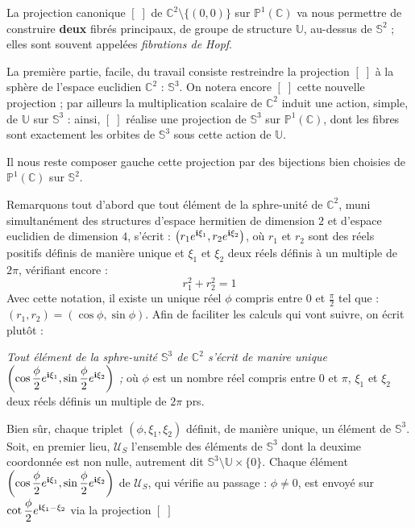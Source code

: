 La projection canonique $[\;]$ de $\mathbb{C}^2\setminus\{(0,0)\}$ sur $\mathbb{P}^1(\mathbb{C})$ va nous permettre de construire %
\textbf{deux} fibr\'es principaux, de groupe de structure $\mathbb{U}$, au-dessus de $\mathbb{S}^2$ ; elles sont souvent appel\'ees \emph{fibrations de Hopf}.
\par
La premi\`ere partie, facile, du travail consiste  restreindre la projection $[\; ]$ \`a la sph\`ere de l'espace euclidien $\mathbb{C}^2$ : $\mathbb{S}^3$. %
On notera encore $[\; ]$ cette nouvelle projection ; par ailleurs la multiplication scalaire de $\mathbb{C}^2$ induit une action, simple, de $\mathbb{U}$ sur $\mathbb{S}^3$ : %
ainsi, $[\;]$ r\'ealise une projection de $\mathbb{S}^3$ sur $\mathbb{P}^1(\mathbb{C})$, %
dont les fibres sont exactement les orbites de $\mathbb{S}^3$ sous cette action de $\mathbb{U}$.
\par
Il nous reste  composer  gauche cette projection par des bijections bien choisies de $\mathbb{P}^1(\mathbb{C})$ sur $\mathbb{S}^2$.
\par
Remarquons tout d'abord que tout \'el\'ement de la sphre-unit\'e de $\mathbb{C}^2$, muni simultan\'ement des structures d'espace hermitien de dimension $2$ et d'espace euclidien de dimension $4$, %
s'\'ecrit : $\left(r_1e^{\mathbf{i}\xi_1},r_2e^{\mathbf{i}\xi_2}\right)$, %
o\`u $r_1$ et $r_2$ sont des r\'eels positifs d\'efinis de mani\`ere unique et $\xi_1$ et $\xi_2$ deux r\'eels d\'efinis \`a un multiple de $2\pi$, v\'erifiant encore :
\[r_1^2+r_2^2=1\]
Avec cette notation, il existe un unique r\'eel $\phi$ compris entre $0$ et $\frac{\pi}{2}$ tel que : $(r_1,r_2)=(\cos\phi , \sin\phi)$. %
Afin de faciliter les calculs qui vont suivre, on \'ecrit plut\^ot : %
\par
\emph{Tout \'el\'ement de la sphre-unit\'e $\mathbb{S}^3$ de $\mathbb{C}^2$ s'\'ecrit de manire unique $\left(\cos\dfrac{\phi}{2}e^{\mathbf{i}\xi_1},\sin\dfrac{\phi}{2}e^{\mathbf{i}\xi_2}\right)$ ;} %
o\`u $\phi$ est un nombre r\'eel compris entre $0$ et $\pi$, $\xi_1$ et $\xi_2$ deux r\'eels d\'efinis  un multiple de $2\pi$ prs.
\par
Bien s\^ur, chaque triplet $(\phi,\xi_1,\xi_2)$ d\'efinit, de mani\`ere unique, un \'el\'ement de $\mathbb{S}^3$.
\ligneinter
Soit, en premier lieu, $\mathcal{U}_S$ l'ensemble des \'el\'ements de $\mathbb{S}^3$ dont la deuxime coordonn\'ee est non nulle, autrement dit $\mathbb{S}^3\setminus\mathbb{U}\times\{0\}$. %
Chaque \'el\'ement $\left(\cos\dfrac{\phi}{2}e^{\mathbf{i}\xi_1},\sin\dfrac{\phi}{2}e^{\mathbf{i}\xi_2}\right)$ de $\mathcal{U}_S$, qui v\'erifie au passage : \boldmath$\phi\neq 0$\unboldmath, est envoy\'e sur $\cot\dfrac{\phi}{2}e^{\mathbf{i}\xi_1-\xi_2}$ via la projection $[\;]$ %
